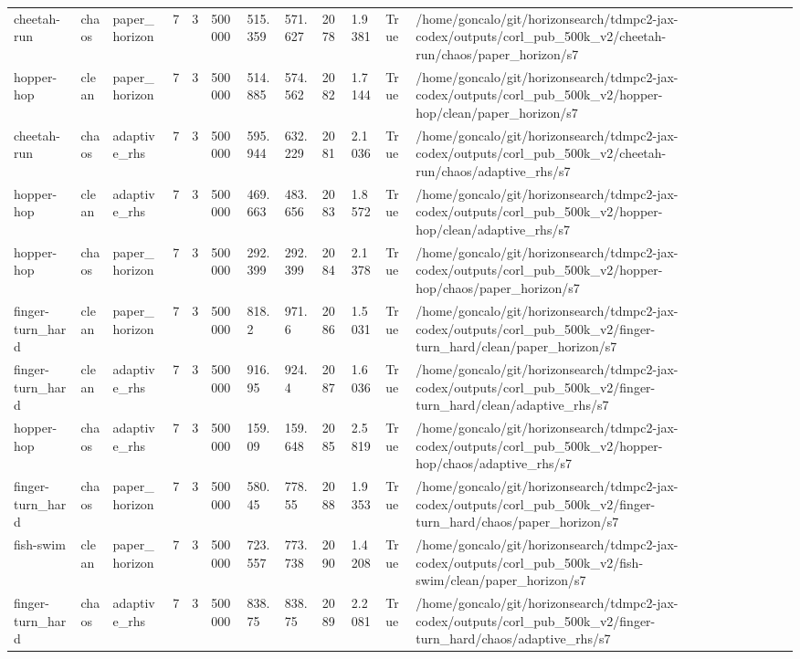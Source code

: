 \begin{tabular}{llllllllllll}
cheetah-run & chaos & paper\_horizon & 7 & 3 & 500000 & 515.359 & 571.627 & 2078 & 1.9381 & True & /home/goncalo/git/horizonsearch/tdmpc2-jax-codex/outputs/corl\_pub\_500k\_v2/cheetah-run/chaos/paper\_horizon/s7 \\
hopper-hop & clean & paper\_horizon & 7 & 3 & 500000 & 514.885 & 574.562 & 2082 & 1.7144 & True & /home/goncalo/git/horizonsearch/tdmpc2-jax-codex/outputs/corl\_pub\_500k\_v2/hopper-hop/clean/paper\_horizon/s7 \\
cheetah-run & chaos & adaptive\_rhs & 7 & 3 & 500000 & 595.944 & 632.229 & 2081 & 2.1036 & True & /home/goncalo/git/horizonsearch/tdmpc2-jax-codex/outputs/corl\_pub\_500k\_v2/cheetah-run/chaos/adaptive\_rhs/s7 \\
hopper-hop & clean & adaptive\_rhs & 7 & 3 & 500000 & 469.663 & 483.656 & 2083 & 1.8572 & True & /home/goncalo/git/horizonsearch/tdmpc2-jax-codex/outputs/corl\_pub\_500k\_v2/hopper-hop/clean/adaptive\_rhs/s7 \\
hopper-hop & chaos & paper\_horizon & 7 & 3 & 500000 & 292.399 & 292.399 & 2084 & 2.1378 & True & /home/goncalo/git/horizonsearch/tdmpc2-jax-codex/outputs/corl\_pub\_500k\_v2/hopper-hop/chaos/paper\_horizon/s7 \\
finger-turn\_hard & clean & paper\_horizon & 7 & 3 & 500000 & 818.2 & 971.6 & 2086 & 1.5031 & True & /home/goncalo/git/horizonsearch/tdmpc2-jax-codex/outputs/corl\_pub\_500k\_v2/finger-turn\_hard/clean/paper\_horizon/s7 \\
finger-turn\_hard & clean & adaptive\_rhs & 7 & 3 & 500000 & 916.95 & 924.4 & 2087 & 1.6036 & True & /home/goncalo/git/horizonsearch/tdmpc2-jax-codex/outputs/corl\_pub\_500k\_v2/finger-turn\_hard/clean/adaptive\_rhs/s7 \\
hopper-hop & chaos & adaptive\_rhs & 7 & 3 & 500000 & 159.09 & 159.648 & 2085 & 2.5819 & True & /home/goncalo/git/horizonsearch/tdmpc2-jax-codex/outputs/corl\_pub\_500k\_v2/hopper-hop/chaos/adaptive\_rhs/s7 \\
finger-turn\_hard & chaos & paper\_horizon & 7 & 3 & 500000 & 580.45 & 778.55 & 2088 & 1.9353 & True & /home/goncalo/git/horizonsearch/tdmpc2-jax-codex/outputs/corl\_pub\_500k\_v2/finger-turn\_hard/chaos/paper\_horizon/s7 \\
fish-swim & clean & paper\_horizon & 7 & 3 & 500000 & 723.557 & 773.738 & 2090 & 1.4208 & True & /home/goncalo/git/horizonsearch/tdmpc2-jax-codex/outputs/corl\_pub\_500k\_v2/fish-swim/clean/paper\_horizon/s7 \\
finger-turn\_hard & chaos & adaptive\_rhs & 7 & 3 & 500000 & 838.75 & 838.75 & 2089 & 2.2081 & True & /home/goncalo/git/horizonsearch/tdmpc2-jax-codex/outputs/corl\_pub\_500k\_v2/finger-turn\_hard/chaos/adaptive\_rhs/s7 \\

\end{tabular}
